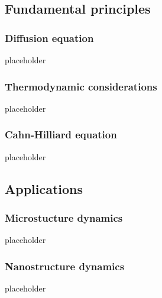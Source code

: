     \subsection{Fundamental principles}
        \subsubsection{Diffusion equation}
            placeholder
        \subsubsection{Thermodynamic considerations}
            placeholder
        \subsubsection{Cahn-Hilliard equation}
            placeholder
    \subsection{Applications}
        \subsubsection{Microstucture dynamics}
            placeholder
        \subsubsection{Nanostructure dynamics}
            placeholder
        
